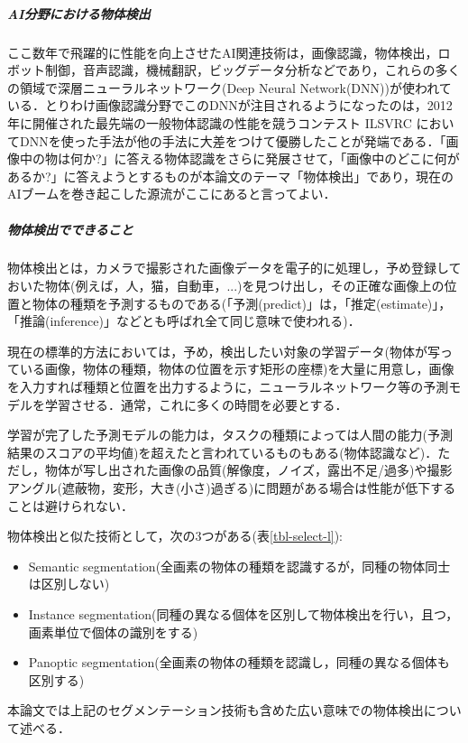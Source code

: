 \documentclass[twocolumn]{jsarticle} %
\begin{document}
\subparagraph{AI分野における物体検出} ここ数年で飛躍的に性能を向上させたAI関連技術は，画像認識，物体検出，ロボット制御，音声認識，機械翻訳，ビッグデータ分析などであり，これらの多くの領域で深層ニューラルネットワーク(Deep Neural Network(DNN))が使われている．とりわけ画像認識分野でこのDNNが注目されるようになったのは，2012年に開催された最先端の一般物体認識の性能を競うコンテスト ILSVRC においてDNNを使った手法が他の手法に大差をつけて優勝したことが発端である．「画像中の物は何か?」に答える物体認識をさらに発展させて，「画像中のどこに何があるか?」に答えようとするものが本論文のテーマ「物体検出」であり，現在のAIブームを巻き起こした源流がここにあると言ってよい．

\subparagraph{物体検出でできること} 物体検出とは，カメラで撮影された画像データを電子的に処理し，予め登録しておいた物体(例えば，人，猫，自動車，...)を見つけ出し，その正確な画像上の位置と物体の種類を予測するものである(「予測(predict)」は，「推定(estimate)」，「推論(inference)」などとも呼ばれ全て同じ意味で使われる)．

現在の標準的方法においては，予め，検出したい対象の学習データ(物体が写っている画像，物体の種類，物体の位置を示す矩形の座標)を大量に用意し，画像を入力すれば種類と位置を出力するように，ニューラルネットワーク等の予測モデルを学習させる．通常，これに多くの時間を必要とする．

学習が完了した予測モデルの能力は，タスクの種類によっては人間の能力(予測結果のスコアの平均値)を超えたと言われているものもある(物体認識など)．ただし，物体が写し出された画像の品質(解像度，ノイズ，露出不足/過多)や撮影アングル(遮蔽物，変形，大き(小さ)過ぎる)に問題がある場合は性能が低下することは避けられない．

物体検出と似た技術として，次の3つがある(表\ref{tbl-select-l}):

\begin{itemize}
    \item Semantic segmentation(全画素の物体の種類を認識するが，同種の物体同士は区別しない)
    \item Instance segmentation(同種の異なる個体を区別して物体検出を行い，且つ，画素単位で個体の識別をする)
    \item Panoptic segmentation(全画素の物体の種類を認識し，同種の異なる個体も区別する)
\end{itemize}
本論文では上記のセグメンテーション技術も含めた広い意味での物体検出について述べる．
\end{document}
